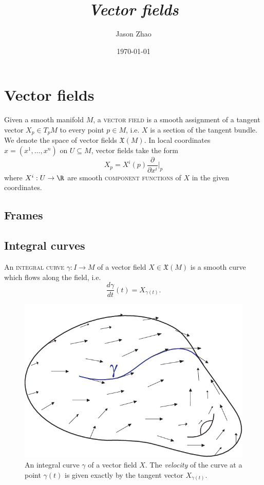 \documentclass[reqno]{amsart}
\title
{
	\emph{Vector fields}
}
\author{Jason Zhao}
\date{\today}
\theoremstyle{definition}
\theoremstyle{remark}
\renewcommand{\emph}{\textsc}
\begin{document}
\maketitle
\tableofcontents

\section{Vector fields}

Given a smooth manifold $M$, a \emph{vector field} is a smooth assignment of a tangent vector $X_p \in T_p M$ to every point $p \in M$, i.e. $X$ is a section of the tangent bundle. We denote the space of vector fields $\mathfrak X (M)$. In local coordinates $x = (x^1, \dots, x^n)$ on $U \subseteq M$, vector fields take the form
	\[ X_p = X^i (p) \frac{\partial}{\partial x^i} \Big|_{p} \]
where $X^i : U \to \R$ are smooth \emph{component functions} of $X$ in the given coordinates. 

\subsection{Frames}




\subsection{Integral curves}

An \emph{integral curve} $\gamma : I \to M$ of a vector field $X \in \mathfrak X (M)$ is a smooth curve which flows along the field, i.e.
	\[ \frac{d\gamma}{dt} (t) = X_{\gamma(t)}. \]
\begin{center}
\begin{figure}[h]
	\includegraphics[scale = 0.3]{curve}
	\caption{An integral curve $\gamma$ of a vector field $X$. The \textit{velocity} of the curve at a point $\gamma(t)$ is given exactly by the tangent vector $X_{\gamma(t)}$.}
\end{figure}
\end{center}
\end{document}
